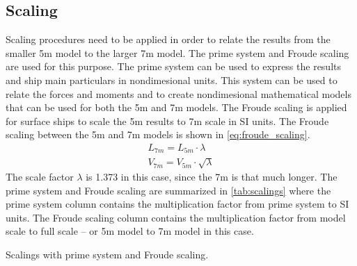 \subsection{Scaling} \label{sec:scale_effects}
Scaling procedures need to be applied in order to relate the results from the smaller 5m model to the larger 7m model. The prime system and Froude scaling are used for this purpose. The prime system can be used to express the results and ship main particulars in nondimesional units. This system can be used to relate the forces and moments and to create nondimesional mathematical models that can be used for both the 5m and 7m models. The Froude scaling is applied for surface ships \citep{ittc_ittc_2008} to scale the 5m results to 7m scale in SI units. The Froude scaling between the 5m and 7m models is shown in \autoref{eq:froude_scaling}.
\begin{equation}
    \label{eq:froude_scaling}
    \begin{split}
        L_{7m} = L_{5m} \cdot \lambda \\
        V_{7m} = V_{5m} \cdot \sqrt{\lambda}
    \end{split}
\end{equation}
The scale factor $\lambda$ is 1.373 in this case, since the 7m is that much longer. The prime system and Froude scaling are summarized in \autoref{tab:scalings} where the prime system column contains the multiplication factor from prime system to SI units. The Froude scaling column contains the multiplication factor from model scale to full scale -- or 5m model to 7m model in this case.
\begin{table}[h]
    \centering
    \caption{Scalings with prime system and Froude scaling.}
    \label{tab:scalings}
\end{table}

